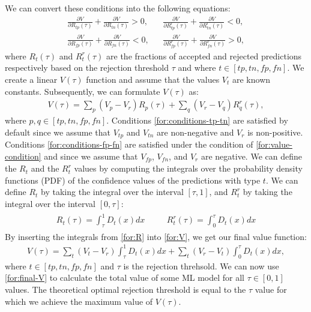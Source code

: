 % 
We can convert these conditions into the following equations:
\begin{subequations}
    \label{for:conditions}
    \begin{align}
        \frac{\partial V}{\partial R_{tp}(\tau)} + \frac{\partial V}{\partial R_{tn}(\tau)} > 0, &  &
        \frac{\partial V}{\partial R^r_{tp}(\tau)} + \frac{\partial V}{\partial R^r_{tn}(\tau)} < 0, \label{for:conditions-tp-tn} \\
        \frac{\partial V}{\partial R_{fp}(\tau)} + \frac{\partial V}{\partial R_{fn}(\tau)} < 0, &  &
        \frac{\partial V}{\partial R^r_{fp}(\tau)} + \frac{\partial V}{\partial R^r_{fn}(\tau)} > 0, \label{for:conditions-fp-fn}
    \end{align}
\end{subequations}
%
where $R_t(\tau)$ and $R_t^r(\tau)$ are the fractions of accepted and rejected predictions respectively based on the rejection threshold $\tau$ and where $t \in [tp, tn, fp, fn]$.
%
We create a linear $V(\tau)$ function and assume that the values $V_t$ are known constants.
%
Subsequently, we can formulate $V(\tau)$ as:
\begin{align}
    \label{for:V}
    V(\tau) = \sum_{p} (V_p - V_r)R_p(\tau) + \sum_{q} (V_r - V_q)R^r_{q}(\tau),
\end{align}
%
where $p, q \in [tp, tn, fp, fn]$.
%
Conditions \ref{for:conditions-tp-tn} are satisfied by default since we assume that $V_{tp}$ and $V_{tn}$ are non-negative and $V_r$ is non-positive.
%
Conditions \ref{for:conditions-fp-fn} are satisfied under the condition of \ref{for:value-condition} and since we assume that $V_{fp}$, $V_{fn}$, and $V_r$ are negative.
% 
We can define the $R_t$ and the $R_t^r$ values by computing the integrals over the probability density functions (PDF) of the confidence values of the predictions with type $t$.
%
We can define $R_t$ by taking the integral over the interval $[\tau, 1]$, and $R_t^r$ by taking the integral over the interval $[0, \tau]$:
%
\begin{align}
    \label{for:R}
    \begin{aligned}
        R_{t}(\tau) = \int_\tau^1 D_{t}(x)dx & \quad & R_{t}^r(\tau) = \int_0^\tau D_{t}(x)dx
    \end{aligned}
\end{align}
%
By inserting the integrals from \ref{for:R} into \ref{for:V}, we get our final value function:
%
\begin{align}
    \label{for:final-V}
    V(\tau) = \sum_{t} (V_t - V_r)\int_\tau^1 D_{t}(x)dx + \sum_{t} (V_r - V_t)\int_0^\tau D_{t}(x)dx,
\end{align}
%
where $t \in [tp, tn, fp, fn]$ and $\tau$ is the rejection threhsold.
%
We can now use \ref{for:final-V} to calculate the total value of some ML model for all $\tau \in [0, 1]$ values.
%
The theoretical optimal rejection threshold is equal to the $\tau$ value for which we achieve the maximum value of $V(\tau)$.


